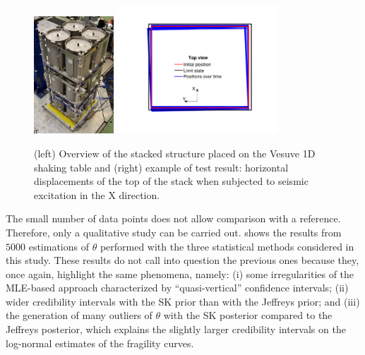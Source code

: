 \begin{figure}[h]
    \centering		
    \hspace*{0.3cm}\includegraphics[width=3cm]{figures/intro-frags/EDEN.jpg}
    \hspace{0.5cm}
    \includegraphics[width=6cm]{figures/intro-frags/EDEN_R169.pdf}
    \caption{(left) Overview of the stacked structure placed on the Vesuve 1D shaking table and (right) example of test result: horizontal displacements of the top of the stack when subjected to seismic excitation in the X direction.}
    \label{fig:PREM:EDEN}
\end{figure}  


The small number of data points does not allow comparison with a reference. Therefore, only a qualitative study can be carried out.  shows the results from $5000$ estimations of $\theta$ performed with the three {statistical methods considered in this study}. These results do not call into question the previous ones because they, once again, highlight the same phenomena, namely: (i) some irregularities of the MLE-based approach characterized by ``quasi-vertical'' confidence intervals; (ii) wider credibility intervals with the SK prior than with the Jeffreys prior; and (iii) the generation of many outliers of $\theta$ with the SK posterior compared to the Jeffreys posterior, which explains the slightly larger credibility intervals on the log-normal estimates of the fragility curves.

